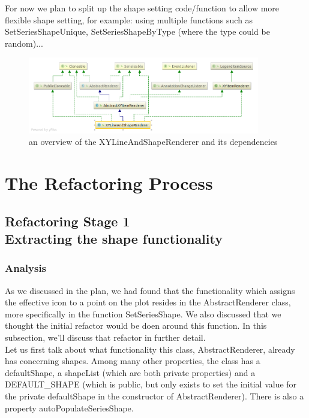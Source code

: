 \documentclass{article}
\begin{document}
For now we plan to split up the shape setting code/function to allow more flexible shape setting, for example: using multiple functions such as SetSeriesShapeUnique, SetSeriesShapeByType (where the type could be random)...

\begin{figure}[H]
\centering
	\includegraphics[width=0.9\textwidth]{XYLineAndShapeRenderer.png}
	\caption{an overview of the XYLineAndShapeRenderer and its dependencies}
\end{figure}

\section{The Refactoring Process}

\subsection[Section Title. Section Subtitle]{Refactoring Stage 1\\ {\large Extracting the shape functionality}}


\subsubsection{Analysis}

As we discussed in the plan, we had found that the functionality which assigns the effective icon to a point on the plot resides in the AbstractRenderer class, more specifically in the function SetSeriesShape. We also discussed that we thought the initial refactor would be doen around this function. In this subsection, we'll discuss that refactor in further detail.\\

Let us first talk about what functionality this class, AbstractRenderer, already has concerning shapes. Among many other properties, the class has a defaultShape, a shapeList (which are both private properties) and a DEFAULT\_SHAPE (which is public, but only exists to set the initial value for the private defaultShape in the constructor of AbstractRenderer). There is also a property autoPopulateSeriesShape.\\
\end{document}
